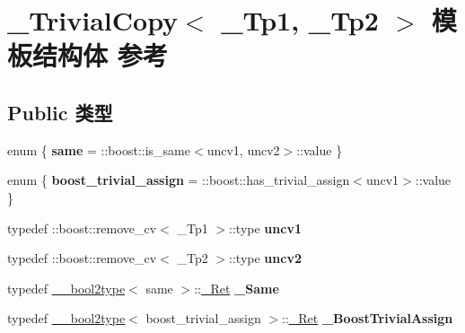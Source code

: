 \hypertarget{struct___trivial_copy}{}\section{\+\_\+\+Trivial\+Copy$<$ \+\_\+\+Tp1, \+\_\+\+Tp2 $>$ 模板结构体 参考}
\label{struct___trivial_copy}
\subsection*{Public 类型}
\begin{DoxyCompactItemize}
\item 
\mbox{\label{struct___trivial_copy_a326e280f978b5374ebe6b3752e91c87b}} 
enum \{ {\bfseries same} = \+:\+:boost\+:\+:is\+\_\+same$<$uncv1, uncv2$>$\+:\+:value
 \}
\item 
\mbox{\label{struct___trivial_copy_a3b97637781d569418d53ef66767c814e}} 
enum \{ {\bfseries boost\+\_\+trivial\+\_\+assign} = \+:\+:boost\+:\+:has\+\_\+trivial\+\_\+assign$<$uncv1$>$\+:\+:value
 \}
\item 
\mbox{\label{struct___trivial_copy_aebc0abc982b0a73e5fdc2c47f3e28165}} 
typedef \+::boost\+::remove\+\_\+cv$<$ \+\_\+\+Tp1 $>$\+::type {\bfseries uncv1}
\item 
\mbox{\label{struct___trivial_copy_af1ba2f01505be2afb80e5de87bb6e39b}} 
typedef \+::boost\+::remove\+\_\+cv$<$ \+\_\+\+Tp2 $>$\+::type {\bfseries uncv2}
\item 
\mbox{\label{struct___trivial_copy_a455a14546d9eba239e59c0b8196319ab}} 
typedef \hyperlink{struct____bool2type}{\+\_\+\+\_\+bool2type}$<$ same $>$\+::\hyperlink{struct____true__type}{\+\_\+\+Ret} {\bfseries \+\_\+\+Same}
\item 
\mbox{\label{struct___trivial_copy_a3ed95873b8c00f71d56cb0dabb7f860a}} 
typedef \hyperlink{struct____bool2type}{\+\_\+\+\_\+bool2type}$<$ boost\+\_\+trivial\+\_\+assign $>$\+::\hyperlink{struct____true__type}{\+\_\+\+Ret} {\bfseries \+\_\+\+Boost\+Trivial\+Assign}
\item 
\mbox{\label{struct___trivial_copy_a85261470654f3c64530e89879b928293}} 

\end{DoxyCompactItemize}

